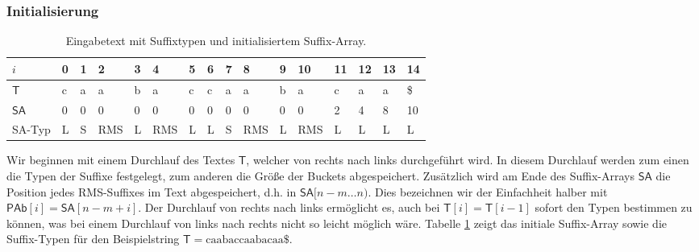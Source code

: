 \subsubsection{Initialisierung}


\begin{table}
	\centering
	\resizebox{\columnwidth}{!} {%
		\begin{tabular}{l|l|l|l|l|l|l|l|l|l|l|l|l|l|l|l}
			$i$      & 0 & 1 & 2   & 3 & 4   & 5 & 6 & 7 & 8   & 9 & 10  & 11 & 12 & 13 & 14 \\ \hline
			$\mathsf{T}$      & c & a & a   & b & a   & c & c & a & a   & b & a   & c  & a  & a  & \$ \\ \hline
			$\mathsf{SA}$     & 0 & 0 & 0   & 0 & 0   & 0 & 0 & 0 & 0   & 0 & 0   & \cellcolor[HTML]{32CB00}2  & \cellcolor[HTML]{32CB00}4  & \cellcolor[HTML]{32CB00}8  & \cellcolor[HTML]{32CB00}10 \\ \hline
			SA-Typ & L & S & RMS & L & RMS & L & L & S & RMS & L & RMS & L  & L  & L  & L 
		\end{tabular}%
	}
	\caption{Eingabetext mit Suffixtypen und initialisiertem Suffix-Array.}
	\label{table:sa-init}
\end{table}





Wir beginnen mit einem Durchlauf des Textes $\mathsf{T}$, welcher von rechts nach links durchgeführt wird. In diesem Durchlauf werden zum einen die Typen der Suffixe festgelegt, zum anderen die Größe der Buckets abgespeichert. Zusätzlich wird am Ende des Suffix-Arrays $\mathsf{SA}$ die Position jedes RMS-Suffixes im Text abgespeichert, d.h. in $\mathsf{SA}[n-m\dots n)$. Dies bezeichnen wir der Einfachheit halber mit $\mathsf{PAb}[i] = \mathsf{SA}[n-m+i]$. Der Durchlauf von rechts nach links ermöglicht es, auch bei $\mathsf{T}[i] = \mathsf{T}[i-1]$ sofort den Typen bestimmen zu können, was bei einem Durchlauf von links nach rechts nicht so leicht möglich wäre. Tabelle \ref{table:sa-init} zeigt das initiale Suffix-Array sowie die Suffix-Typen für den Beispielstring $ \mathsf{T} = \text{caabaccaabacaa\$}$.



